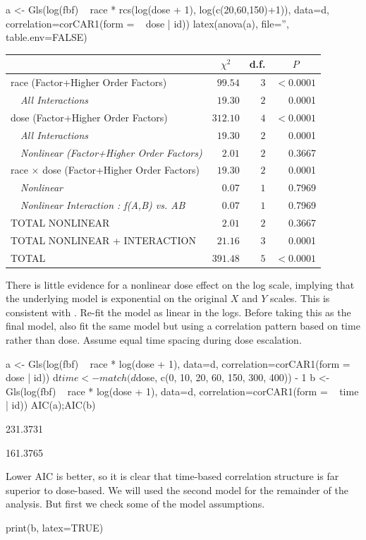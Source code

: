 \begin{Sinput}
a <- Gls(log(fbf) ~ race * rcs(log(dose + 1), log(c(20,60,150)+1)), data=d,
         correlation=corCAR1(form = ~ dose | id))
latex(anova(a), file='', table.env=FALSE)
\end{Sinput}
\begin{center}
\begin{tabular}{lrrr}
\hline\hline
\multicolumn{1}{l}{}&\multicolumn{1}{c}{$\chi^2$}&\multicolumn{1}{c}{d.f.}&\multicolumn{1}{c}{$P$}\tabularnewline
\hline
race  (Factor+Higher Order Factors)&$ 99.54$&$3$&$<0.0001$\tabularnewline
~~{\it All Interactions}&$ 19.30$&$2$&~0.0001\tabularnewline
dose  (Factor+Higher Order Factors)&$312.10$&$4$&$<0.0001$\tabularnewline
~~{\it All Interactions}&$ 19.30$&$2$&~0.0001\tabularnewline
~~{\it Nonlinear (Factor+Higher Order Factors)}&$  2.01$&$2$&~0.3667\tabularnewline
race $\times$ dose  (Factor+Higher Order Factors)&$ 19.30$&$2$&~0.0001\tabularnewline
~~{\it Nonlinear}&$  0.07$&$1$&~0.7969\tabularnewline
~~{\it Nonlinear Interaction : f(A,B) vs. AB}&$  0.07$&$1$&~0.7969\tabularnewline
TOTAL NONLINEAR&$  2.01$&$2$&~0.3667\tabularnewline
TOTAL NONLINEAR + INTERACTION&$ 21.16$&$3$&~0.0001\tabularnewline
TOTAL&$391.48$&$5$&$<0.0001$\tabularnewline
\hline
\end{tabular}\end{center}

There is little evidence for a nonlinear dose effect on the log scale, 
implying that the underlying model is exponential on the original $X$
and $Y$ scales.  This is consistent with \citet{dupmod}.  Re-fit the
model as linear in the logs.  Before taking this as the final model,
also fit the same model but using a correlation pattern based on time
rather than dose.  Assume equal time spacing during dose escalation. \ipacue
\begin{Schunk}
\begin{Sinput}
a <- Gls(log(fbf) ~ race * log(dose + 1), data=d,
         correlation=corCAR1(form = ~ dose | id))
d$time <- match(d$dose, c(0, 10, 20, 60, 150, 300, 400)) - 1
b <- Gls(log(fbf) ~ race * log(dose + 1), data=d,
         correlation=corCAR1(form = ~ time | id))
AIC(a);AIC(b)
\end{Sinput}
\begin{Soutput}
[1] 231.3731
\end{Soutput}
\begin{Soutput}
[1] 161.3765
\end{Soutput}
\end{Schunk}
Lower AIC is better, so it is clear that time-based correlation
structure is far superior to dose-based.  We will used the second
model for the remainder of the analysis.  But first we check some of
the model assumptions.
\begin{Sinput}
print(b, latex=TRUE)
\end{Sinput}

